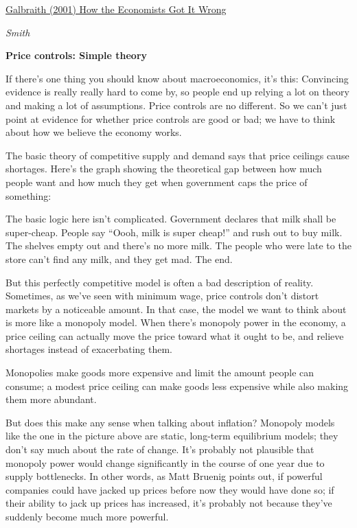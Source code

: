 \documentclass[
]{book}
\begin{document}
\href{https://prospect.org/features/economists-got-wrong/}{Galbraith (2001) How the Economists Got It Wrong}

\emph{Smith}

\textbf{Price controls: Simple theory}

If there's one thing you should know about macroeconomics, it's this: Convincing evidence is really really hard to come by, so people end up relying a lot on theory and making a lot of assumptions. Price controls are no different. So we can't just point at evidence for whether price controls are good or bad; we have to think about how we believe the economy works.

The basic theory of competitive supply and demand says that price ceilings cause shortages. Here's the graph showing the theoretical gap between how much people want and how much they get when government caps the price of something:

The basic logic here isn't complicated. Government declares that milk shall be super-cheap. People say ``Oooh, milk is super cheap!'' and rush out to buy milk. The shelves empty out and there's no more milk. The people who were late to the store can't find any milk, and they get mad. The end.

But this perfectly competitive model is often a bad description of reality. Sometimes, as we've seen with minimum wage, price controls don't distort markets by a noticeable amount. In that case, the model we want to think about is more like a monopoly model. When there's monopoly power in the economy, a price ceiling can actually move the price toward what it ought to be, and relieve shortages instead of exacerbating them.

\href{fig/price_control_monopoly.png}{}

Monopolies make goods more expensive and limit the amount people can consume; a modest price ceiling can make goods less expensive while also making them more abundant.

But does this make any sense when talking about inflation? Monopoly models like the one in the picture above are static, long-term equilibrium models; they don't say much about the rate of change. It's probably not plausible that monopoly power would change significantly in the course of one year due to supply bottlenecks. In other words, as Matt Bruenig points out, if powerful companies could have jacked up prices before now they would have done so; if their ability to jack up prices has increased, it's probably not because they've suddenly become much more powerful.
\end{document}
